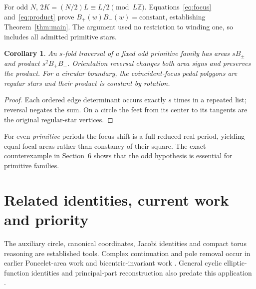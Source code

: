 \documentclass[11pt]{article}
\newtheorem{corollary}[theorem]{Corollary}
\begin{document}
For odd $N$, $2K=(N/2)L\equiv L/2\pmod{L\mathbb Z}$.
Equations~\eqref{eq:focus} and~\eqref{eq:product} prove
$B_+(w)B_-(w)=\mathrm{constant}$, establishing Theorem~\ref{thm:main}.
The argument used no restriction to winding one, so includes all
admitted primitive stars.

\begin{corollary}
An $s$-fold traversal of a fixed odd primitive family has areas $sB_\pm$
and product $s^2B_+B_-$. Orientation reversal changes both area signs
and preserves the product. For a circular boundary, the coincident-focus
pedal polygons are regular stars and their product is constant by rotation.
\end{corollary}
\begin{proof}
Each ordered edge determinant occurs exactly $s$ times in a repeated
list; reversal negates the sum. On a circle the feet from its center to
its tangents are the original regular-star vertices.
\end{proof}
For even \emph{primitive} periods the focus shift is a full reduced real
period, yielding equal focal areas rather than constancy of their square.
The exact counterexample in Section~6 shows that the odd hypothesis is essential for primitive families.

\section{Related identities, current work and priority}
The auxiliary circle, canonical coordinates, Jacobi identities and compact
torus reasoning are established tools. Complex continuation and pole
removal occur in earlier Poncelet-area work
\cite{AST,Chavez} and bicentric-invariant work \cite{RGR}.
General cyclic elliptic-function identities and principal-part
reconstruction also predate this application \cite{KLS}.
\end{document}
